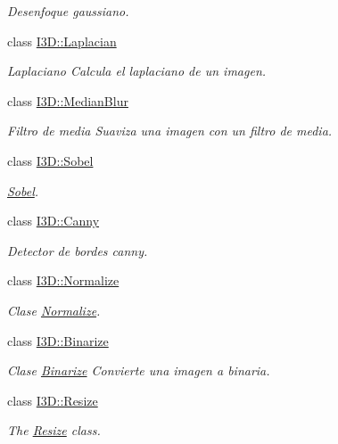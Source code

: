 \begin{DoxyCompactItemize}
\begin{DoxyCompactList}\small\item\em Desenfoque gaussiano. \end{DoxyCompactList}\item 
class \hyperlink{class_i3_d_1_1_laplacian}{I3\+D\+::\+Laplacian}
\begin{DoxyCompactList}\small\item\em Laplaciano Calcula el laplaciano de un imagen. \end{DoxyCompactList}\item 
class \hyperlink{class_i3_d_1_1_median_blur}{I3\+D\+::\+Median\+Blur}
\begin{DoxyCompactList}\small\item\em Filtro de media Suaviza una imagen con un filtro de media. \end{DoxyCompactList}\item 
class \hyperlink{class_i3_d_1_1_sobel}{I3\+D\+::\+Sobel}
\begin{DoxyCompactList}\small\item\em \hyperlink{class_i3_d_1_1_sobel}{Sobel}. \end{DoxyCompactList}\item 
class \hyperlink{class_i3_d_1_1_canny}{I3\+D\+::\+Canny}
\begin{DoxyCompactList}\small\item\em Detector de bordes canny. \end{DoxyCompactList}\item 
class \hyperlink{class_i3_d_1_1_normalize}{I3\+D\+::\+Normalize}
\begin{DoxyCompactList}\small\item\em Clase \hyperlink{class_i3_d_1_1_normalize}{Normalize}. \end{DoxyCompactList}\item 
class \hyperlink{class_i3_d_1_1_binarize}{I3\+D\+::\+Binarize}
\begin{DoxyCompactList}\small\item\em Clase \hyperlink{class_i3_d_1_1_binarize}{Binarize} Convierte una imagen a binaria. \end{DoxyCompactList}\item 
class \hyperlink{class_i3_d_1_1_resize}{I3\+D\+::\+Resize}
\begin{DoxyCompactList}\small\item\em The \hyperlink{class_i3_d_1_1_resize}{Resize} class. \end{DoxyCompactList}\item 

\end{DoxyCompactItemize}
